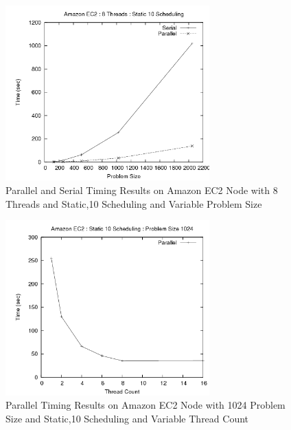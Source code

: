 \documentclass{article}
\begin{document}
\begin{figure}
\centering
\includegraphics[width=0.7\textwidth]{../data/amazon_n.png}
\caption{Parallel and Serial Timing Results on Amazon EC2 Node with 8 Threads and Static,10 Scheduling and Variable Problem Size}
\label{amazon_n}
\end{figure}

\begin{figure}
\centering
\includegraphics[width=0.7\textwidth]{../data/amazon_threads.png}
\caption{Parallel Timing Results on Amazon EC2 Node with 1024 Problem Size and Static,10 Scheduling and Variable Thread Count}
\label{amazon_threads}
\end{figure}
\end{document}
